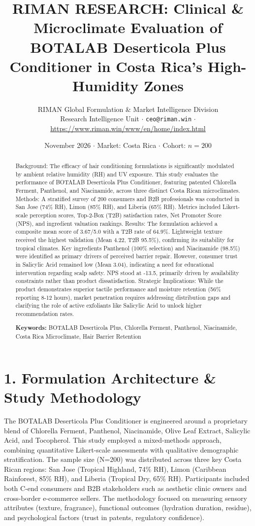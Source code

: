 \documentclass[10pt,twocolumn,a4paper]{article}
\title{\textbf{RIMAN RESEARCH: Clinical \& Microclimate Evaluation of BOTALAB Deserticola Plus Conditioner in Costa Rica's High-Humidity Zones}}
\author{RIMAN Global Formulation \& Market Intelligence Division\\
\small Research Intelligence Unit $\cdot$ \texttt{ceo@riman.win} $\cdot$ \url{https://www.riman.win/www/en/home/index.html}}
\date{November 2026 \quad $\cdot$ \quad Market: Costa Rica \quad $\cdot$ \quad Cohort: $n = 200$}
\begin{document}
\maketitle

\begin{abstract}
Background: The efficacy of hair conditioning formulations is significantly modulated by ambient relative humidity (RH) and UV exposure. This study evaluates the performance of BOTALAB Deserticola Plus Conditioner, featuring patented Chlorella Ferment, Panthenol, and Niacinamide, across three distinct Costa Rican microclimates. Methods: A stratified survey of 200 consumers and B2B professionals was conducted in San Jose (74\% RH), Limon (85\% RH), and Liberia (65\% RH). Metrics included Likert-scale perception scores, Top-2-Box (T2B) satisfaction rates, Net Promoter Score (NPS), and ingredient valuation rankings. Results: The formulation achieved a composite mean score of 3.67/5.0 with a T2B rate of 64.9\%. Lightweight texture received the highest validation (Mean 4.22, T2B 95.5\%), confirming its suitability for tropical climates. Key ingredients Panthenol (100\% selection) and Niacinamide (98.5\%) were identified as primary drivers of perceived barrier repair. However, consumer trust in Salicylic Acid remained low (Mean 3.04), indicating a need for educational intervention regarding scalp safety. NPS stood at -13.5, primarily driven by availability constraints rather than product dissatisfaction. Strategic Implications: While the product demonstrates superior tactile performance and moisture retention (56\% reporting 8-12 hours), market penetration requires addressing distribution gaps and clarifying the role of active exfoliants like Salicylic Acid to unlock higher recommendation rates.

\vspace{0.4em}
\noindent\textbf{Keywords:} BOTALAB Deserticola Plus, Chlorella Ferment, Panthenol, Niacinamide, Costa Rica Microclimate, Hair Barrier Retention
\end{abstract}

\section{1. Formulation Architecture \& Study Methodology}
The BOTALAB Deserticola Plus Conditioner is engineered around a proprietary blend of Chlorella Ferment, Panthenol, Niacinamide, Olive Leaf Extract, Salicylic Acid, and Tocopherol. This study employed a mixed-methods approach, combining quantitative Likert-scale assessments with qualitative demographic stratification. The sample size (N=200) was distributed across three key Costa Rican regions: San Jose (Tropical Highland, 74\% RH), Limon (Caribbean Rainforest, 85\% RH), and Liberia (Tropical Dry, 65\% RH). Participants included both C-end consumers and B2B stakeholders such as aesthetic clinic owners and cross-border e-commerce sellers. The methodology focused on measuring sensory attributes (texture, fragrance), functional outcomes (hydration duration, residue), and psychological factors (trust in patents, regulatory confidence).
\end{document}
